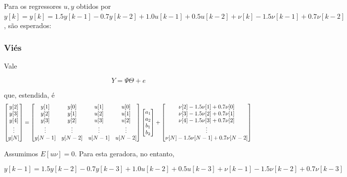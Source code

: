\documentclass{article}
\begin{document}
Para os regressores $u, y$ obtidos por $y[k] = y[k] = 1.5y[k-1] - 0.7y[k-2] + 1.0u[k-1] + 0.5u[k-2] + \nu[k] - 1.5\nu[k-1] + 0.7\nu[k-2]$, são esperados:

\subsubsection*{Viés}

Vale

\begin{equation*}
Y = \Psi\Theta + e
\end{equation*}

que, estendida, é
\begin{equation*}
\begin{bmatrix}
y[2] \\
y[3] \\
y[4] \\
\vdots \\
y[N]
\end{bmatrix} =
\begin{bmatrix}
y[1] & y[0] & u[1] & u[0] \\
y[2] & y[1] & u[2] & u[1] \\
y[3] & y[2] & u[3] & u[2] \\
\vdots & \vdots & \vdots & \vdots \\
y[N-1] & y[N-2] & u[N-1] & u[N-2]
\end{bmatrix}
\begin{bmatrix}
a_1 \\
a_2 \\
b_1 \\
b_2
\end{bmatrix} +
\begin{bmatrix}
\nu[2] - 1.5\nu[1] + 0.7\nu[0] \\
\nu[3] - 1.5\nu[2] + 0.7\nu[1] \\
\nu[4] - 1.5\nu[3] + 0.7\nu[2] \\
\vdots \\
\nu[N] - 1.5\nu[N-1] + 0.7\nu[N-2]
\end{bmatrix} \\
\end{equation*}

Assumimos $E[u\nu] = 0$. Para esta geradora, no entanto,

\begin{equation*}
y[k - 1] = 1.5y[k - 2] - 0.7y[k - 3] + 1.0u[k - 2] + 0.5u[k - 3] + \nu[k - 1] - 1.5\nu[k - 2] + 0.7\nu[k - 3]
\end{equation*}
\end{document}
